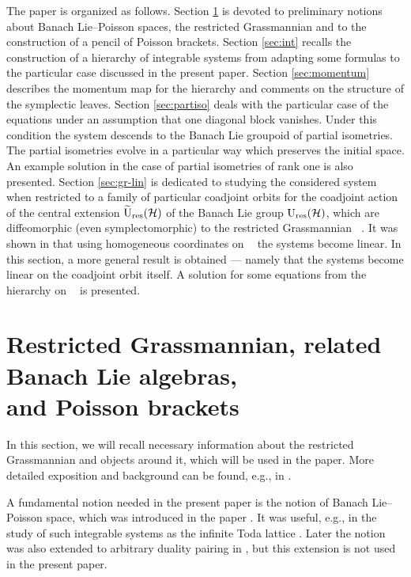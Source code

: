 \documentclass[10pt,a4paper]{amsart}
\theoremstyle{definition}
\numberwithin{equation}{section}
\renewcommand{\H}{\mathcal{H}}
\DeclareMathOperator{\Gr}{Gr_{res}(\H,\H_+)}
\newcommand{\Ur}{\mathrm{U}_{\textnormal{res}}(\H)}
\newcommand{\Urt}{\widetilde{\mathrm{U}}_{\textnormal{res}}(\H)}
\begin{document}
The paper is organized as follows. Section \ref{sec:gr} is devoted to preliminary notions about Banach Lie--Poisson spaces, the restricted Grassmannian and to the construction of a pencil of Poisson brackets. Section \ref{sec:int} recalls the construction of a hierarchy of integrable systems from \cite{GO-grass} adapting some formulas to the particular case discussed in the present paper.
Section \ref{sec:momentum} describes the momentum map for the hierarchy and comments on the structure of the symplectic leaves.
Section \ref{sec:partiso} deals with the particular case of the equations under an assumption that one diagonal block vanishes. Under this condition the system descends to the Banach Lie groupoid of partial isometries. The partial isometries evolve in a particular way which preserves the initial space. An example solution in the case of partial isometries of rank one is also presented.
Section \ref{sec:gr-lin} is dedicated to studying the considered system when restricted to a family of particular coadjoint orbits for the coadjoint action of the central extension $\Urt$ of the Banach Lie group $\Ur$, which are diffeomorphic (even symplectomorphic) to the restricted Grassmannian $\Gr$. It was shown in \cite{GO-grass} that using homogeneous coordinates on $\Gr$ the systems become linear. In this section, a more general result is obtained --- namely that the systems become linear on the coadjoint orbit itself. A solution for some equations from the hierarchy on $\Gr$ is presented.

\section[Restricted Grassmannian, related Banach Lie algebras, and Poisson brackets]{Restricted Grassmannian, related Banach Lie algebras,\\ and Poisson brackets}\label{sec:gr}

In this section, we will recall necessary information about the restricted Grassmannian and objects around it, which will be used in the paper. More detailed exposition and background can be found, e.g., in \cite{Ratiu-grass,GO-grass,mickelsson,OR,segal,wurzbacher}.

A fundamental notion needed in the present paper is the notion of Banach Lie--Poisson space, which was introduced in the paper \cite[Definition 4.1 and Theorem 4.2]{OR}. It was useful, e.g., in the study of such integrable systems as the infinite Toda lattice \cite{Oind}. Later the notion was also extended to arbitrary duality pairing in \cite[Definition 3.12 and Theorem 3.14]{tumpach-bruhat}, but this extension is not used in the present paper.
\end{document}
